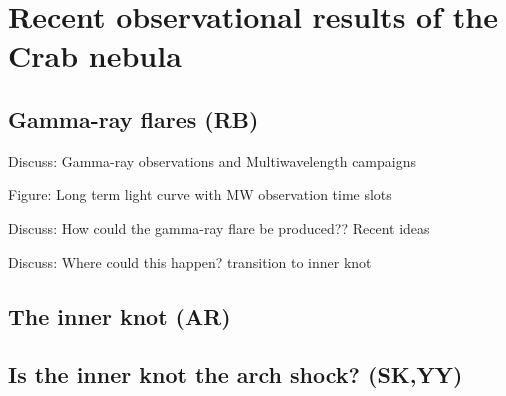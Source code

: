 \section{Recent observational results of the Crab nebula}
\subsection{Gamma-ray flares (RB)}
Discuss: Gamma-ray observations and Multiwavelength campaigns

Figure: Long term light curve with MW observation time slots

Discuss: How could the gamma-ray flare be produced??
Recent ideas  \cite{2016arXiv160403179Y}\cite{2015arXiv151205426Z}\cite{2016arXiv160304850N}\cite{2016arXiv160305731L}

Discuss: Where could this happen? transition to inner knot
\subsection{The inner knot   (AR)}
\subsection{Is the inner knot the arch shock?                                      (SK,YY)}
